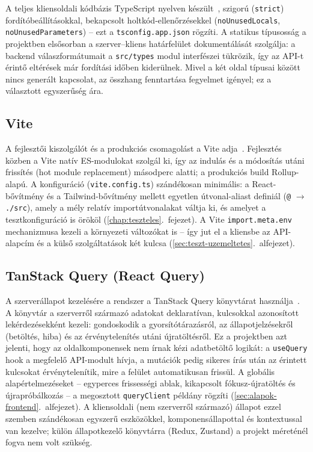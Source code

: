 A teljes kliensoldali kódbázis TypeScript nyelven készült~\cite{tshandbook}, szigorú
(\texttt{strict}) fordítóbeállításokkal, bekapcsolt holtkód-ellenőrzésekkel
(\texttt{noUnusedLocals}, \texttt{noUnusedParameters}) -- ezt a \texttt{tsconfig.app.json}
rögzíti. A statikus típusosság a projektben elsősorban a szerver--kliens határfelület
dokumentálását szolgálja: a backend válaszformátumait a \texttt{src/types} modul interfészei
tükrözik, így az API-t érintő eltérések már fordítási időben kiderülnek. Mivel a két oldal
típusai között nincs generált kapcsolat, az összhang fenntartása fegyelmet igényel; ez a
választott egyszerűség ára.

\subsection{Vite}

A fejlesztői kiszolgálót és a produkciós csomagolást a Vite adja~\cite{vitedocs}. Fejlesztés
közben a Vite natív ES-modulokat szolgál ki, így az indulás és a módosítás utáni frissítés
(hot module replacement) másodperc alatti; a produkciós build Rollup-alapú. A konfiguráció
(\texttt{vite.config.ts}) szándékosan minimális: a React-bővítmény és a Tailwind-bővítmény
mellett egyetlen útvonal-aliast definiál (\texttt{@} $\rightarrow$ \texttt{./src}), amely a
mély relatív importútvonalakat váltja ki, és amelyet a tesztkonfiguráció is örököl
(\ref{chap:teszteles}.~fejezet). A Vite \texttt{import.meta.env} mechanizmusa kezeli a
környezeti változókat is -- így jut el a kliensbe az API-alapcím és a külső szolgáltatások két
kulcsa (\ref{sec:teszt-uzemeltetes}.~alfejezet).

\subsection{TanStack Query (React Query)}

A szerverállapot kezelésére a rendszer a TanStack Query könyvtárat
használja~\cite{tanstackquery}. A könyvtár a szerverről származó adatokat deklaratívan,
kulcsokkal azonosított lekérdezésekként kezeli: gondoskodik a gyorsítótárazásról, az
állapotjelzésekről (betöltés, hiba) és az érvénytelenítés utáni újratöltésről. Ez a projektben
azt jelenti, hogy az oldalkomponensek nem írnak kézi adatbetöltő logikát: a \texttt{useQuery}
hook a megfelelő API-modult hívja, a mutációk pedig sikeres írás után az érintett kulcsokat
érvénytelenítik, mire a felület automatikusan frissül. A globális alapértelmezéseket -- egyperces
frissességi ablak, kikapcsolt fókusz-újratöltés és újrapróbálkozás -- a megosztott
\texttt{queryClient} példány rögzíti (\ref{sec:alapok-frontend}.~alfejezet). A kliensoldali
(nem szerverről származó) állapot ezzel szemben szándékosan egyszerű eszközökkel,
komponensállapottal és kontextussal van kezelve; külön állapotkezelő könyvtárra (Redux,
Zustand) a projekt méreténél fogva nem volt szükség.

